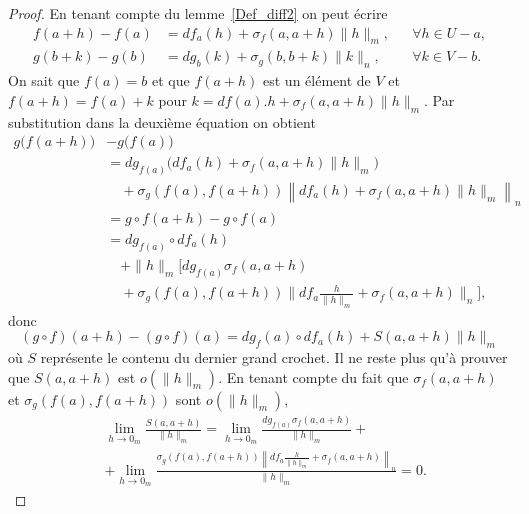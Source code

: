 \begin{proof}
	En tenant compte du lemme~\ref{Def_diff2} on peut écrire
	\begin{subequations}
		\begin{align}
			f(a+h)-f(a) & =df_a(h)+\sigma_f(a,a+h)\|h\|_m, &  & \forall h\in U-a, \\
			g(b+k)-g(b) & =dg_b(k)+\sigma_g(b,b+k)\|k\|_n, &  & \forall k\in V-b.
		\end{align}
	\end{subequations}
	On sait que \( f(a)=b\) et que \( f(a+h)\) est  un élément de \( V\) et \( f(a+h)=f(a)+k\) pour \( k=df(a).h+\sigma_f(a,a+h)\|h\|_m\).  Par substitution dans la deuxième équation on obtient
	\begin{equation}
		\begin{aligned}
			g\big(f(a+h)\big) & - g\big(f(a)\big)                                                                                  \\
			                  & =dg_{f(a)}\Big(df_a(h)+\sigma_f(a,a+h)\|h\|_m\Big)                                                 \\
			                  & \quad+\sigma_g\left(f(a), f(a+h)\right)\left\| df_a(h)+\sigma_f(a,a+h)\|h\|_m\right \|_n           \\
			                  & =g\circ f (a+h) - g\circ f (a)                                                                     \\
			                  & = dg_{f(a)}\circ df_a(h)                                                                           \\
			                  & \quad +\|h\|_m\Big[ dg_{f(a)}\sigma_f(a,a+h)                                                       \\
			                  & \quad+\sigma_g\left(f(a), f(a+h)\right)\big\| df_a\frac{h}{\|h\|_m}+\sigma_f(a,a+h)\big \|_n\Big],
		\end{aligned}
	\end{equation}
	donc
	\begin{equation}
		(g\circ f) (a+h) - (g\circ f) (a) = dg_f(a)\circ df_a(h) + S(a,a+h) \|h\|_m
	\end{equation}
	où \( S\) représente le contenu du dernier grand crochet. Il ne reste plus qu'à prouver que \( S(a,a+h)\) est \( o(\|h\|_m)\). En tenant compte du fait que \( \sigma_f(a,a+h)\) et \( \sigma_g\left(f(a), f(a+h)\right)\) sont \( o (\|h\|_m)\),
	\begin{equation}
		\begin{aligned}
			 & \lim_{h\to 0_m} \frac{S(a,a+h)}{\|h\|_m}= \lim_{h\to 0_m}\frac{dg_{f(a)}\sigma_f(a,a+h)}{\|h\|_m}+                              \\
			 & + \lim_{h\to 0_m}\frac{\sigma_g\left(f(a), f(a+h)\right)\left\| df_a\frac{h}{\|h\|_m}+\sigma_f(a,a+h)\right \|_n}{\|h\|_m} = 0.
		\end{aligned}
	\end{equation}
\end{proof}

